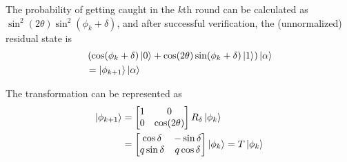 \documentclass[]{article}
\begin{document}
The probability of getting caught in the $k$th round can be calculated as $\sin^2(2\theta) \sin^2(\phi_k + \delta)$, and after successful verification, the (unnormalized) residual state is 
\begin{align}
    &\left(\cos(\phi_k + \delta) \ket{0} +\cos(2\theta)\sin(\phi_k + \delta)\ket{1}\right)\ket{\alpha} \\
    &= \ket{\phi_{k + 1}} \ket{\alpha}
\end{align}

The transformation can be represented as 
\begin{align}
    \ket{\phi_{k + 1}} &= \begin{bmatrix}
        1 & 0 \\ 0 & \cos(2 \theta)
    \end{bmatrix} R_{\delta} \ket{\phi_k} \\
    &= \label{eq:T} \begin{bmatrix}
        \cos \delta & -\sin \delta \\ q\sin\delta & q\cos \delta 
    \end{bmatrix}\ket{\phi_k} = T \ket{\phi_k}
\end{align}
\end{document}
